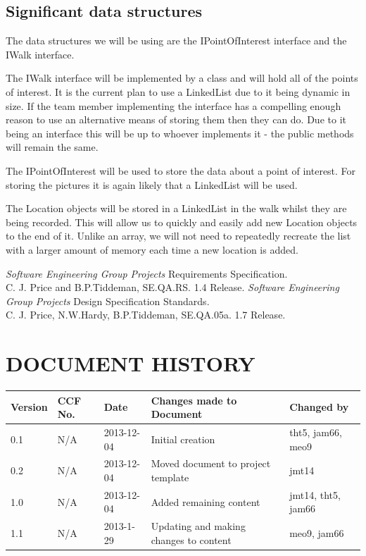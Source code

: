\documentclass{project}
\begin{document}
\subsection{Significant data structures}
The data structures we will be using are the IPointOfInterest interface and the
IWalk interface.

The IWalk interface will be implemented by a class and will hold all of the
points of interest. It is the current plan to use a LinkedList due to it being
dynamic in size. If the team member implementing the interface has a compelling
enough reason to use an alternative means of storing them then they can do. Due
to it being an interface this will be up to whoever implements it - the public
methods will remain the same.

The IPointOfInterest will be used to store the data about a point of interest.
For storing the pictures it is again likely that a LinkedList will be used.

The Location objects will be stored in a LinkedList in the walk
whilst they are being recorded. This will allow us to quickly and easily add
new Location objects to the end of it. Unlike an array, we will not need to
repeatedly recreate the list with a larger amount of memory each time a new
location is added.

\clearpage
{}
\begin{thebibliography}{5}
 \emph{Software Engineering Group Projects}
Requirements Specification. \\
C. J. Price and B.P.Tiddeman, SE.QA.RS. 1.4 Release.
 \emph{Software Engineering Group Projects}
Design Specification Standards. \\
C. J. Price, N.W.Hardy, B.P.Tiddeman, SE.QA.05a. 1.7 Release.
\end{thebibliography}
\section*{DOCUMENT HISTORY}
\begin{tabular}{|l | l | l | l | l |}
\hline
Version & CCF No. & Date & Changes made to Document & Changed by \\
\hline
0.1 & N/A & 2013-12-04 & Initial creation & tht5, jam66, meo9 \\
\hline
0.2 & N/A & 2013-12-04 & Moved document to project template & jmt14 \\
\hline
1.0 & N/A & 2013-12-04 & Added remaining content & jmt14, tht5, jam66 \\
\hline
1.1 & N/A & 2013-1-29 & Updating and making changes to content & meo9, jam66 \\
\hline
\end{tabular}
\label{thelastpage}
\end{document}
